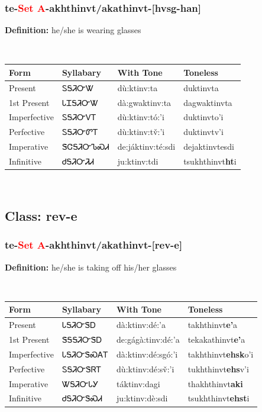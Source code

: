 \subsubsection*{te{-}\textcolor{Red}{Set A}{-}\textbf{akhthinvt/akathinvt}{-}[hvsg-han]}
\nopagebreak
\textbf{Definition: } he/she is wearing glasses
\\[0.5em]
\begin{tabularx}{\textwidth}{l X X X}%
\toprule%
\textbf{Form}&\textbf{Syllabary}&\textbf{With Tone}&\textbf{Toneless}\\%
\midrule%
Present&ᏚᎦᏘᏅᏔ&dù:ktinv:ta&duktinvta\\%
1st Present&ᏓᏆᎦᏘᏅᏔ&dà:gwaktinv:ta&dagwaktinvta\\%
Imperfective&ᏚᎦᏘᏅᏙᎢ&dù:ktinv:tó:’i&duktinvto{\textquoteright}i\\%
Perfective&ᏚᎦᏘᏅᏛᎢ&dù:ktinv:tv̌:’i&duktinvtv{\textquoteright}i\\%
Imperative&ᏕᏣᎦᏘᏅᏖᏍᏗ&de:jáktinv:té:sdi&dejaktinvtesdi\\%
Infinitive&ᏧᎦᏘᏅᏘᏗ&ju:ktinv:tdi&tsukhthinvt\textbf{ht}i\\%
\bottomrule%
\end{tabularx}
\\[1em]
\needspace{3in}
\subsection*{Class: rev-e}
\nopagebreak
\needspace{2in}
\subsubsection*{te{-}\textcolor{Red}{Set A}{-}\textbf{akhthinvt/akathinvt}{-}[rev-e]}
\nopagebreak
\textbf{Definition: } he/she is taking off his/her glasses
\\[0.5em]
\begin{tabularx}{\textwidth}{l X X X}%
\toprule%
\textbf{Form}&\textbf{Syllabary}&\textbf{With Tone}&\textbf{Toneless}\\%
\midrule%
Present&ᏓᎦᏘᏅᏕᎠ&dà:ktinv:dé:’a&takhthinvt\textbf{e'}a\\%
1st Present&ᏕᎦᎦᏘᏅᏕᎠ&de:gágà:tinv:dé:’a&tekakathinvt\textbf{e'}a\\%
Imperfective&ᏓᎦᏘᏅᏕᏍᎪᎢ&dà:ktinv:dé:sgó:’i&takhthinvt\textbf{ehsk}o'i\\%
Perfective&ᏚᎦᏘᏅᏕᏒᎢ&dù:ktinv:dé:sv̌:’i&tukhthinvt\textbf{ehs}v'i\\%
Imperative&ᏔᎦᏘᏅᏓᎩ&táktinv:dagi&thakhthinvt\textbf{aki}\\%
Infinitive&ᏧᎦᏘᏅᏕᏍᏗ&ju:ktinv:dè:sdi&tsukhthinvt\textbf{ehst}i\\%
\bottomrule%
\end{tabularx}
\\[1em]